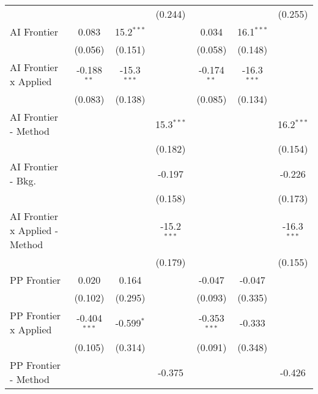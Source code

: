 \begin{tabular}{lcccccc}
                                  &                &                & (0.244)        &                &                & (0.255)\\   
   AI Frontier                    & 0.083          & 15.2$^{***}$   &                & 0.034          & 16.1$^{***}$   &   \\   
                                  & (0.056)        & (0.151)        &                & (0.058)        & (0.148)        &   \\   
   AI Frontier x Applied          & -0.188$^{**}$  & -15.3$^{***}$  &                & -0.174$^{**}$  & -16.3$^{***}$  &   \\   
                                  & (0.083)        & (0.138)        &                & (0.085)        & (0.134)        &   \\   
   AI Frontier - Method           &                &                & 15.3$^{***}$   &                &                & 16.2$^{***}$\\   
                                  &                &                & (0.182)        &                &                & (0.154)\\   
   AI Frontier - Bkg.             &                &                & -0.197         &                &                & -0.226\\   
                                  &                &                & (0.158)        &                &                & (0.173)\\   
   AI Frontier x Applied - Method &                &                & -15.2$^{***}$  &                &                & -16.3$^{***}$\\   
                                  &                &                & (0.179)        &                &                & (0.155)\\   
   PP Frontier                    & 0.020          & 0.164          &                & -0.047         & -0.047         &   \\   
                                  & (0.102)        & (0.295)        &                & (0.093)        & (0.335)        &   \\   
   PP Frontier x Applied          & -0.404$^{***}$ & -0.599$^{*}$   &                & -0.353$^{***}$ & -0.333         &   \\   
                                  & (0.105)        & (0.314)        &                & (0.091)        & (0.348)        &   \\   
   PP Frontier - Method           &                &                & -0.375         &                &                & -0.426\\   

\end{tabular}
